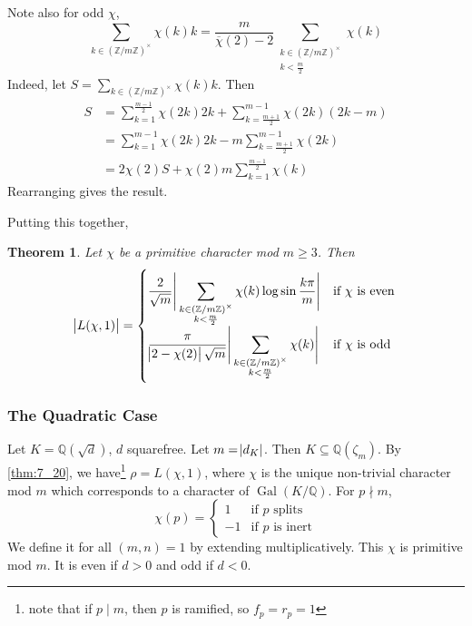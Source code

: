 \documentclass[11pt]{article}
\theoremstyle{definition}
\theoremstyle{plain}
\newtheorem{theorem}[definition]{Theorem}
\theoremstyle{remark}
\DeclareMathOperator{\Gal}{Gal}
\newcommand{\ZZ}{\mathbb{Z}}
\newcommand{\QQ}{\mathbb{Q}}
\begin{document}
\noindent Note also for odd $\chi$,
\begin{equation*}
    \sum_{k \in (\ZZ / m \ZZ)^\times} \chi(k) k = \frac{m}{\overline{\chi}(2) - 2} \sum_{\substack{k \in (\ZZ/m\ZZ)^\times \\ k < \frac{m}{2}}} \chi(k)
\end{equation*}
{\color{blue}
    Indeed, let $S = \sum_{k \in (\ZZ / m\ZZ)^\times} \chi(k) k$. Then
    \begin{align*}
        S
        &= \sum_{k=1}^{\frac{m-1}{2}} \chi(2k) 2k + \sum_{k=\frac{m+1}{2}}^{m-1} \chi(2k) (2k-m)\\
        &= \sum_{k=1}^{m-1} \chi(2k) 2k - m \sum_{k=\frac{m+1}{2}}^{m-1} \chi(2k)\\
        &= 2 \chi(2) S + \chi(2) m \sum_{k=1}^{\frac{m-1}{2}} \chi(k)
    \end{align*}
    Rearranging gives the result.
}

Putting this together,
\begin{theorem}\label{thm:7_26}
    Let $\chi$ be a primitive character mod $m \ge 3$. Then
    \begin{equation*}
        \abs{L(\chi, 1)} = \begin{cases}
            \displaystyle\frac{2}{\sqrt{m}} \Bigg\lvert\sum_{\substack{k \in (\ZZ/m\ZZ)^\times \\ k < \frac{m}{2}}} \chi(k) \log \sin \frac{k \pi}{m} \Bigg\rvert & \text{if } \chi \text{ is even} \\
            \displaystyle\frac{\pi}{\abs{2 - \chi(2)} \sqrt{m}} \Bigg\lvert\sum_{\substack{k \in (\ZZ/m\ZZ)^\times \\ k < \frac{m}{2}}} \chi(k)\Bigg\rvert & \text{if } \chi \text{ is odd}
        \end{cases}
    \end{equation*}
\end{theorem}

\subsubsection*{The Quadratic Case}
Let $K = \QQ(\sqrt{d})$, $d$ squarefree. Let $m = \abs{d_K}$. Then $K \subseteq \QQ(\zeta_m)$. By \autoref{thm:7_20}, we have\footnote{note that if $p \mid m$, then $p$ is ramified, so $f_p = r_p = 1$} $\rho = L(\chi, 1)$, where $\chi$ is the unique non-trivial character mod $m$ which corresponds to a character of $\Gal(K/\QQ)$. For $p \nmid m$,
\begin{equation*}
    \chi(p) = \begin{cases}
        1 & \text{if } p \text{ splits}\\
        -1 & \text{if } p \text{ is inert}
    \end{cases}
\end{equation*}
We define it for all $(m, n) = 1$ by extending multiplicatively. This $\chi$ is primitive mod $m$. It is even if $d > 0$ and odd if $d < 0$. %
\end{document}
